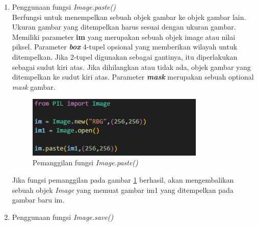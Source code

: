 \begin{enumerate}
	\item Penggunaan fungsi \textit{Image.paste()}\\
	Berfungsi untuk menempelkan sebuah objek gambar ke objek gambar lain. Ukuran gambar yang ditempelkan harus sesuai dengan ukuran gambar. Memiliki parameter \textbf{im} yang merupakan sebuah objek image atau nilai piksel. Parameter \textit{\textbf{box}} 4-tupel opsional yang memberikan wilayah untuk ditempelkan. Jika 2-tupel digunakan sebagai gantinya, itu diperlakukan sebagai sudut kiri atas. Jika dihilangkan atau tidak ada, objek gambar yang ditempelkan ke sudut kiri atas. Parameter \textit{\textbf{mask}} merupakan sebuah optional \textit{mask} gambar.
	\begin{figure}[H]
		\centering
		\includegraphics[width=0.8\textwidth]{Gambar/imagepaste.png}
		\caption{Pemanggilan fungsi \textit{Image.paste()}}
		\label{fig:imagepaste}
	\end{figure}
	Jika fungsi pemanggilan pada gambar \ref{fig:imagepaste} berhasil, akan mengembalikan sebuah objek \textit{Image} yang memuat gambar im1 yang ditempelkan pada gambar baru im.
	\item Penggunaan fungsi \textit{Image.save()}\\
\end{enumerate}




